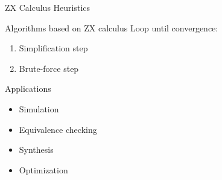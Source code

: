 \begin{refframe}{ZX Calculus Heuristics}

\begin{block}{Algorithms based on ZX calculus}
Loop until convergence:
\begin{enumerate}
	\item Simplification step
	\item Brute-force step
\end{enumerate}
\end{block}


\begin{block}{Applications}
\begin{itemize}
	\item Simulation
	\item Equivalence checking
	\item Synthesis
	\item Optimization
\end{itemize}
\end{block}

	
\end{refframe}












